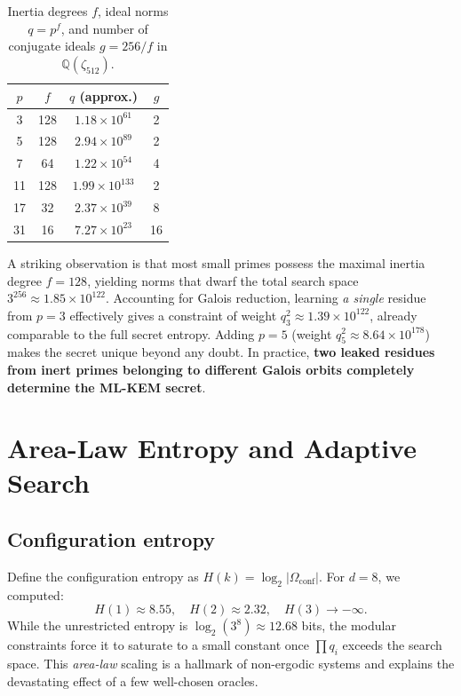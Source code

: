 \documentclass[12pt,a4paper]{article}
\begin{document}
\begin{table}[ht]
\centering
\caption{Inertia degrees $f$, ideal norms $q = p^f$, and number of conjugate ideals $g = 256/f$ in $\mathbb{Q}(\zeta_{512})$.}
\label{tab:inertia}
\begin{tabular}{c c c c}
\toprule
$p$ & $f$ & $q$ (approx.) & $g$ \\
\midrule
3   & 128 & $1.18 \times 10^{61}$ & 2 \\
5   & 128 & $2.94 \times 10^{89}$ & 2 \\
7   & 64  & $1.22 \times 10^{54}$ & 4 \\
11  & 128 & $1.99 \times 10^{133}$ & 2 \\
17  & 32  & $2.37 \times 10^{39}$ & 8 \\
31  & 16  & $7.27 \times 10^{23}$ & 16 \\
\bottomrule
\end{tabular}
\end{table}

A striking observation is that most small primes possess the maximal inertia degree $f=128$, yielding norms that dwarf the total search space $3^{256} \approx 1.85 \times 10^{122}$. Accounting for Galois reduction, learning \emph{a single} residue from $p=3$ effectively gives a constraint of weight $q_3^2 \approx 1.39 \times 10^{122}$, already comparable to the full secret entropy. Adding $p=5$ (weight $q_5^2 \approx 8.64 \times 10^{178}$) makes the secret unique beyond any doubt. In practice, \textbf{two leaked residues from inert primes belonging to different Galois orbits completely determine the ML-KEM secret}.

\section{Area-Law Entropy and Adaptive Search}
\label{sec:entropy}

\subsection{Configuration entropy}
Define the configuration entropy as $H(k) = \log_2 |\Omega_{\mathrm{conf}}|$. For $d=8$, we computed:
\[
H(1) \approx 8.55,\quad H(2) \approx 2.32,\quad H(3) \to -\infty.
\]
While the unrestricted entropy is $\log_2(3^8) \approx 12.68$ bits, the modular constraints force it to saturate to a small constant once $\prod q_i$ exceeds the search space. This \emph{area-law} scaling is a hallmark of non-ergodic systems and explains the devastating effect of a few well-chosen oracles.
\end{document}
